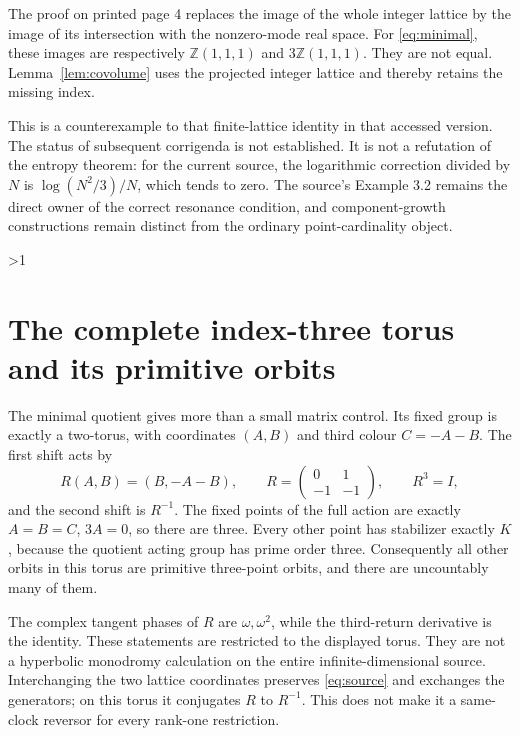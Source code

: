 \documentclass[10pt]{article}
\newcommand{\Z}{\mathbb Z}
\begin{document}
The proof on printed page 4 replaces the image of the whole integer lattice
by the image of its intersection with the nonzero-mode real space.
For \eqref{eq:minimal}, these images are respectively
$\Z(1,1,1)$ and $3\Z(1,1,1)$. They are not equal.
Lemma~\ref{lem:covolume} uses the projected integer lattice and thereby
retains the missing index.

This is a counterexample to that finite-lattice identity in that accessed
version. The status of subsequent corrigenda is not established. It is not
a refutation of the entropy theorem: for the current source, the
logarithmic correction divided by $N$ is $\log(N^2/3)/N$, which tends to
zero. The source's Example 3.2 remains the direct owner of the correct
resonance condition, and component-growth constructions remain distinct
from the ordinary point-cardinality object.
\fi

\ifnum\CRevisionRound>1
\section{The complete index-three torus and its primitive orbits}\label{sec:orbits}
The minimal quotient gives more than a small matrix control. Its fixed
group is exactly a two-torus, with coordinates $(A,B)$ and third colour
$C=-A-B$. The first shift acts by
\begin{equation}\label{eq:R}
 R(A,B)=(B,-A-B),\qquad
 R=\begin{pmatrix}0&1\\-1&-1\end{pmatrix},
 \qquad R^3=I,
\end{equation}
and the second shift is $R^{-1}$.
The fixed points of the full action are exactly $A=B=C$, $3A=0$,
so there are three. Every other point has stabilizer exactly $K$, because
the quotient acting group has prime order three. Consequently all other
orbits in this torus are primitive three-point orbits, and there are
uncountably many of them.

The complex tangent phases of $R$ are $\omega,\omega^2$, while the
third-return derivative is the identity. These statements are restricted
to the displayed torus. They are not a hyperbolic monodromy calculation
on the entire infinite-dimensional source. Interchanging the two lattice
coordinates preserves \eqref{eq:source} and exchanges the generators;
on this torus it conjugates $R$ to $R^{-1}$. This does not make it a
same-clock reversor for every rank-one restriction.
\end{document}

